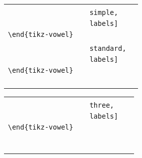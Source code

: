 \documentclass{article}
\begin{document}
\begin{center}
\begin{tabular}{ll}
  \begin{minipage}[t]{6.5cm}{\small
    \verb|\begin{tikz-vowel}[triangle,|\\
    \verb|                    simple,|\\
    \verb|                    labels]|\\
    \verb|\end{tikz-vowel}|\\}
  \end{minipage} &
  \begin{minipage}[t]{6.5cm}{\small
    \verb|\begin{tikz-vowel}[triangle,|\\
    \verb|                    standard,|\\
    \verb|                    labels]|\\
    \verb|\end{tikz-vowel}|\\}
  \end{minipage} \\
  \begin{minipage}[t]{6.5cm}{
  \hspace*{-1.75cm}
  \begin{tikz-vowel}\end{tikz-vowel} \\}\end{minipage} &
  \begin{minipage}[t]{6.5cm}{
  \hspace*{-1.5cm}
  \begin{tikz-vowel}\end{tikz-vowel} \\}\end{minipage}
\end{tabular}

\vskip 18pt

\begin{tabular}{ll}
  \begin{minipage}[t]{6.5cm}{\small
    \verb|\begin{tikz-vowel}[triangle,|\\
    \verb|                    three,|\\
    \verb|                    labels]|\\
    \verb|\end{tikz-vowel}|\\}
  \end{minipage} & 
  \begin{minipage}[t]{6.5cm}
  {~}
  \end{minipage} \\
  \begin{minipage}[t]{6.5cm}{
  \hspace*{-1.75cm}
  \begin{tikz-vowel}\end{tikz-vowel} \\}\end{minipage} &
\end{tabular}
\end{center}
\end{document}
